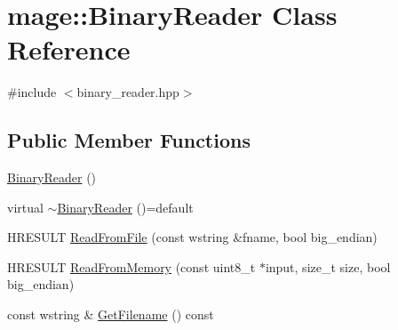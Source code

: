 \hypertarget{classmage_1_1_binary_reader}{}\section{mage\+:\+:Binary\+Reader Class Reference}
\label{classmage_1_1_binary_reader}


{\ttfamily \#include $<$binary\+\_\+reader.\+hpp$>$}

\subsection*{Public Member Functions}
\begin{DoxyCompactItemize}
\item 
\hyperlink{classmage_1_1_binary_reader_aab82579cef4f2f022273cf1adfcc8497}{Binary\+Reader} ()
\item 
virtual \hyperlink{classmage_1_1_binary_reader_aa300382cfa1585bb2f76c4e764bb5617}{$\sim$\+Binary\+Reader} ()=default
\item 
H\+R\+E\+S\+U\+LT \hyperlink{classmage_1_1_binary_reader_ad1d395eabc03da0a52fc0df59623e0a4}{Read\+From\+File} (const wstring \&fname, bool big\+\_\+endian)
\item 
H\+R\+E\+S\+U\+LT \hyperlink{classmage_1_1_binary_reader_ac0bf066e76b7ac0f5308109ae431007d}{Read\+From\+Memory} (const uint8\+\_\+t $\ast$input, size\+\_\+t size, bool big\+\_\+endian)
\item 
const wstring \& \hyperlink{classmage_1_1_binary_reader_a10a0ec56fe7f8e63964ffca2afe019a3}{Get\+Filename} () const
\end{DoxyCompactItemize}
